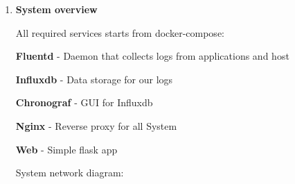 \documentclass[12pt]{article}
\renewcommand{\_}{\kern-1.5pt\textunderscore\kern-1.5pt}
\begin{document}
\vspace{\baselineskip}
\begin{enumerate}
	\item \textbf{System overview}\par

\tab 
\vspace{\baselineskip}\begin{FlushLeft}
\tab All required services starts from docker-compose:
\end{FlushLeft}\par


\vspace{\baselineskip}
\begin{FlushLeft}
\tab \textbf{Fluentd} - Daemon that collects logs from applications and host
\end{FlushLeft}\par

\begin{FlushLeft}
\tab \textbf{Influxdb} - Data storage for our logs
\end{FlushLeft}\par

\begin{FlushLeft}
\tab \textbf{Chronograf} - GUI for Influxdb
\end{FlushLeft}\par

\begin{FlushLeft}
\tab \textbf{Nginx} - Reverse proxy for all System
\end{FlushLeft}\par

\begin{FlushLeft}
\tab \textbf{Web} - Simple flask app 
\end{FlushLeft}\par


\vspace{\baselineskip}

\vspace{\baselineskip}

\vspace{\baselineskip}

\vspace{\baselineskip}
\tab 
\vspace{\baselineskip}
\vspace{\baselineskip}

\vspace{\baselineskip}
\begin{FlushLeft}
System network diagram:
\end{FlushLeft}\par




\end{enumerate}
\end{document}
